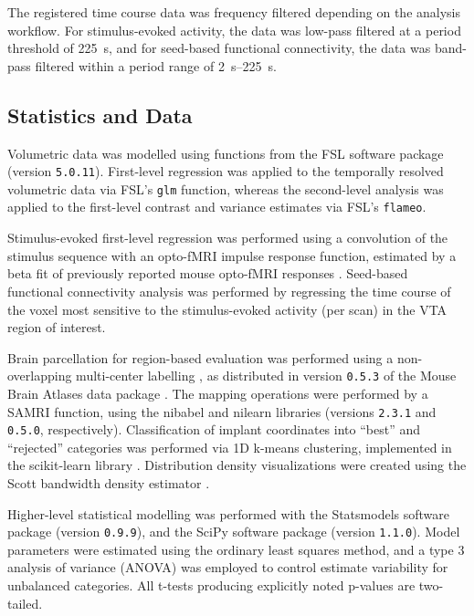 The registered time course data was frequency filtered depending on the analysis workflow.
For stimulus-evoked activity, the data was low-pass filtered at a period threshold of \SI{225}{\second}, and for seed-based functional connectivity, the data was band-pass filtered within a period range of \SIrange{2}{225}{\second}.

\subsection{Statistics and Data}
Volumetric data was modelled using functions from the FSL software package \cite{fsl} (version \textcolor{mg}{\texttt{5.0.11}}).
First-level regression was applied to the temporally resolved volumetric data via FSL's \textcolor{mg}{\texttt{glm}} function, whereas the second-level analysis was applied to the first-level contrast and variance estimates via FSL's \textcolor{mg}{\texttt{flameo}}.

Stimulus-evoked first-level regression was performed using a convolution of the stimulus sequence with an opto-fMRI impulse response function, estimated by a beta fit of previously reported mouse opto-fMRI responses \cite{Grandjean2019}.
Seed-based functional connectivity analysis was performed by regressing the time course of the voxel most sensitive to the stimulus-evoked activity (per scan) in the VTA region of interest.

Brain parcellation for region-based evaluation was performed using a non-overlapping multi-center labelling \cite{dsu1,dsu2,dsu3,dsu4}, as distributed in version \textcolor{mg}{\texttt{0.5.3}} of the Mouse Brain Atlases data package \cite{atlases_generator}.
The mapping operations were performed by a SAMRI function, using the nibabel \cite{nibabel} and nilearn \cite{nilearn} libraries (versions \textcolor{mg}{\texttt{2.3.1}} and \textcolor{mg}{\texttt{0.5.0}}, respectively).
Classification of implant coordinates into “best” and “rejected” categories was performed via 1D k-means clustering, implemented in the scikit-learn library \cite{scikit-learn}.
Distribution density visualizations were created using the Scott bandwidth density estimator \cite{Scott1979}.

Higher-level statistical modelling was performed with the Statsmodels software package \cite{statsmodels} (version \textcolor{mg}{\texttt{0.9.9}}), and the SciPy software package \cite{scipy} (version \textcolor{mg}{\texttt{1.1.0}}).
Model parameters were estimated using the ordinary least squares method, and a type 3 analysis of variance (ANOVA) was employed to control estimate variability for unbalanced categories.
All t-tests producing explicitly noted p-values are two-tailed.

